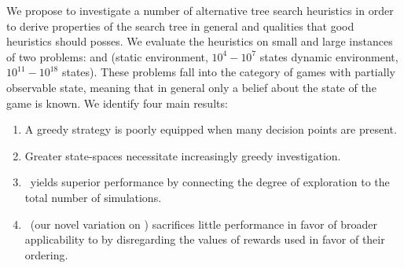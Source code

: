 We propose to investigate a number of alternative tree search heuristics in order to derive properties of the search tree in general and qualities that good heuristics should posses. We evaluate the heuristics on small and large instances of two problems: \rock and \poc (static environment, $10^4 - 10^7$ states \vs dynamic environment, $10^{11} - 10^{18}$ states). These problems fall into the category of games with partially observable state, meaning that in general only a belief about the state of the game is known. We identify four main results:
\vspace{-4mm}
\begin{enumerate}[topsep=0pt,itemsep=-1ex,partopsep=1ex,parsep=1ex]
\item A greedy strategy is poorly equipped when many decision points are present.
\item Greater state-spaces necessitate increasingly greedy investigation.
\item ~\soft yields superior performance by connecting the degree of exploration to the total number of simulations.
\item ~\rsoft (our novel variation on \soft) sacrifices little performance in favor of broader applicability to \soft by disregarding the values of rewards used in favor of their ordering.
\end{enumerate}